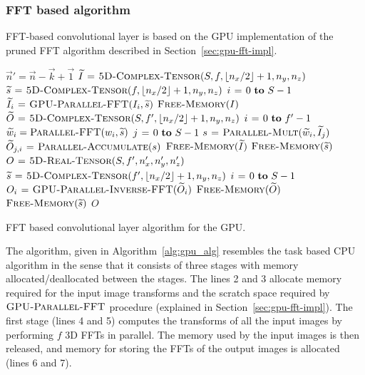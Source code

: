 \documentclass[conference]{./IEEEtran/IEEEtran}
\DeclarePairedDelimiter{\floor}{\lfloor}{\rfloor}
\begin{document}
\subsubsection{FFT based algorithm}

  FFT-based convolutional layer is based on the GPU implementation of
  the pruned FFT algorithm described in
  Section~\ref{sec:gpu-fft-impl}.

  \begin{algorithm}
    {\footnotesize
    \begin{codebox}
      \li $\vec{n}' = \vec{n} - \vec{k} + \vec{1}$
      \li $\widetilde{I} \gets \proc{5D-Complex-Tensor}(S,f,\floor{n_x/2}+1,n_y,n_z)$
      \li $\widetilde{s} \gets \proc{5D-Complex-Tensor}(f,\floor{n_x/2}+1,n_y,n_z)$
      \li \For $i \gets 0 \To S-1$
      \li   \Do $\widetilde{I}_{i} \mathrel{\hspace{1pt}=\hspace{1pt}} \textnormal{\scshape GPU-Parallel-FFT}(I_{i},\widetilde{s})$
      \End
      \li $\textnormal{\scshape Free-Memory}(I)$
      \li $\widetilde{O} \gets \proc{5D-Complex-Tensor}(S,f',\floor{n_x/2}+1,n_y,n_z)$
      \li \For $i \gets 0 \To f'-1$
      \li    \Do $\widetilde{w}_{i} = \textnormal{\scshape Parallel-FFT}(w_{i},\widetilde{s})$
      \li        \For $j \gets 0 \To S-1$
      \li           \Do $s \mathrel{\hspace{1pt}=\hspace{1pt}} \textnormal{\scshape Parallel-Mult}(\widetilde{w}_{i}, \widetilde{I}_{j})$
      \li               $\widetilde{O}_{j,i} \mathrel{\hspace{1pt}=\hspace{1pt}} \textnormal{\scshape Parallel-Accumulate}(s)$
      \End \End
      \li $\textnormal{\scshape Free-Memory}(\widetilde{I})$
      \li $\textnormal{\scshape Free-Memory}(\widetilde{s})$
      \li $O \mathrel{\hspace{1pt}=\hspace{1pt}} \textnormal{\scshape5D-Real-Tensor}(S,f',n'_x,n'_y,n'_z)$
      \li $\widetilde{s} \gets \proc{5D-Complex-Tensor}(f',\floor{n_x/2}+1,n_y,n_z)$
      \li \For $i \gets 0 \To S-1$
      \li   \Do $O_{i} \mathrel{\hspace{1pt}=\hspace{1pt}} \textnormal{\scshape GPU-Parallel-Inverse-FFT}(\widetilde{O}_{i})$
      \End
      \li $\textnormal{\scshape Free-Memory}(\widetilde{O})$
      \li $\textnormal{\scshape Free-Memory}(\widetilde{s})$
      \li \Return $O$
    \end{codebox}
    }

    \caption{FFT based convolutional layer algorithm for the GPU.}
    \label{alg:gpu_alg}
  \end{algorithm}

  The algorithm, given in Algorithm~\ref{alg:gpu_alg} resembles the
  task based CPU algorithm in the sense that it consists of three
  stages with memory allocated/deallocated between the stages.  The
  lines 2 and 3 allocate memory required for the input image
  transforms and the scratch space required by
  $\textnormal{\scshape GPU-Parallel-FFT}$ procedure (explained in
  Section~\ref{sec:gpu-fft-impl}).  The first stage (lines 4 and 5)
  computes the transforms of all the input images by performing $f$ 3D
  FFTs in parallel.  The memory used by the input images is then
  released, and memory for storing the FFTs of the output images is
  allocated (lines 6 and 7).
\end{document}
